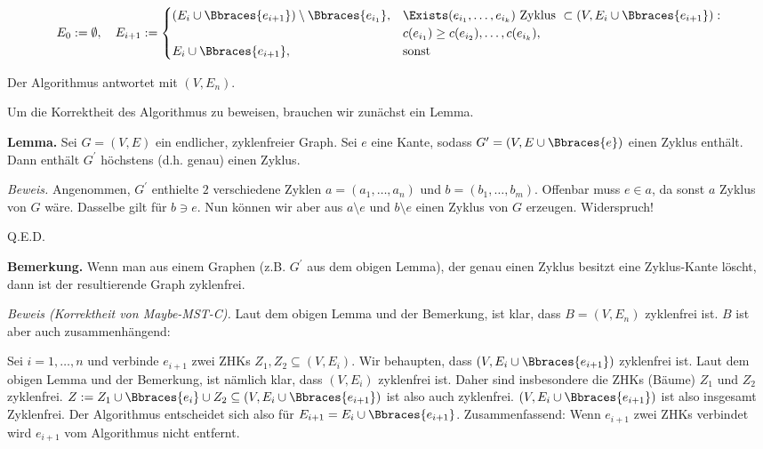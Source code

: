 \begin{solution}
\begin{enumerate}[label = (\Alph*)]
    \begin{align*}
        E_0 := \emptyset,
        \quad
        E_{i+1}
        :=
        \begin{cases}
            (E_i \cup \Bbraces{e_{i+1}}) \setminus \Bbraces{e_{i_1}},
            &
            \Exists (e_{i_1}, \dots, e_{i_k}) ~\text{Zyklus}~ \subset (V, E_i \cup \Bbraces{e_{i+1}}): \\
            &
            c(e_{i_1}) \geq c(e_{i_2}), \dots, c(e_{i_k}), \\
            E_i \cup \Bbraces{e_{i+1}}, & \text{sonst}
        \end{cases}
    \end{align*}

    Der Algorithmus antwortet mit $(V, E_n)$.

    Um die Korrektheit des Algorithmus zu beweisen, brauchen wir zunächst ein Lemma.

    \textbf{Lemma.}
    Sei $G = (V, E)$ ein endlicher, zyklenfreier Graph.
    Sei $e$ eine Kante, sodass $G^\prime = (V, E \cup \Bbraces{e})$ einen Zyklus enthält.
    Dann enthält $G^\prime$ höchstens (d.h. genau) einen Zyklus.

    \textit{Beweis.}
    Angenommen, $G^\prime$ enthielte $2$ verschiedene Zyklen $a = (a_1, \dots, a_n)$ und $b = (b_1, \dots, b_m)$.
    Offenbar muss $e \in a$, da sonst $a$ Zyklus von $G$ wäre.
    Dasselbe gilt für $b \ni e$.
    Nun können wir aber aus $a \setminus e$ und $b \setminus e$ einen Zyklus von $G$ erzeugen.
    Widerspruch!

    Q.E.D.

    \textbf{Bemerkung.}
    Wenn man aus einem Graphen (z.B. $G^\prime$ aus dem obigen Lemma), der genau einen Zyklus besitzt eine Zyklus-Kante löscht, dann ist der resultierende Graph zyklenfrei.

    \textit{Beweis (Korrektheit von Maybe-MST-C).}
    Laut dem obigen Lemma und der Bemerkung, ist klar, dass $B = (V, E_n)$ zyklenfrei ist.
    $B$ ist aber auch zusammenhängend:

    Sei $i = 1, \dots, n$ und verbinde $e_{i+1}$ zwei ZHKs $Z_1, Z_2 \subseteq (V, E_i)$.
    Wir behaupten, dass $(V, E_i \cup \Bbraces{e_{i+1}})$ zyklenfrei ist.
    Laut dem obigen Lemma und der Bemerkung, ist nämlich klar, dass $(V, E_i)$ zyklenfrei ist.
    Daher sind insbesondere die ZHKs (Bäume) $Z_1$ und $Z_2$ zyklenfrei.
    $Z := Z_1 \cup \Bbraces{e_i} \cup Z_2 \subseteq (V, E_i \cup \Bbraces{e_{i+1}})$ ist also auch zyklenfrei.
    $(V, E_i \cup \Bbraces{e_{i+1}})$ ist also insgesamt Zyklenfrei.
    Der Algorithmus entscheidet sich also für $E_{i+1} = E_i \cup \Bbraces{e_{i+1}}$.
    Zusammenfassend:
    Wenn $e_{i+1}$ zwei ZHKs verbindet wird $e_{i+1}$ vom Algorithmus nicht entfernt.


\end{enumerate}
\end{solution}
